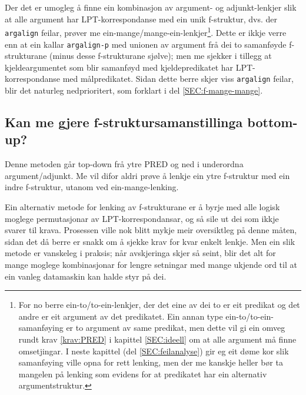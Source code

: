 \documentclass[12pt,a4paper,oneside,draft]{report}
\begin{document}
Der det er umogleg å finne ein kombinasjon av argument- og
 adjunkt-lenkjer slik at alle argument har LPT\hyp{}korrespondanse med ein
 unik f\hyp{}struktur, dvs. der \texttt{argalign} feilar, prøver me
 ein-mange/mange-ein-lenkjer\footnote{For no berre ein-to/to-ein-lenkjer, der det eine av dei to er
        eit predikat og det andre er eit argument av det
        predikatet. Ein annan type ein-to/to-ein-samanføying er to
        argument av same predikat, men dette vil gi ein omveg rundt
        krav \ref{krav:PRED} i kapittel \ref{SEC:ideell} om at alle
        argument må finne omsetjingar. I neste kapittel (del
        \ref{SEC:feilanalyse}) gir eg eit døme kor slik samanføying
        ville opna for rett lenking, men der me kanskje heller bør ta
        mangelen på lenking som evidens for at predikatet har ein
        alternativ argumentstruktur. }. Dette er ikkje verre enn at ein
 kallar \texttt{argalign-p} med unionen av argument frå dei to samanføyde
 f\hyp{}strukturane (minus desse f\hyp{}strukturane sjølve); men me sjekker i
 tillegg at kjeldeargumentet som blir samanføyd med kjeldepredikatet
 har LPT\hyp{}korrespondanse med målpredikatet. Sidan dette berre skjer
 viss \texttt{argalign} feilar, blir det naturleg nedprioritert, som forklart
 i del \ref{SEC:f-mange-mange}.

\subsection{Kan me gjere f\hyp{}struktursamanstillinga bottom-up?}
\label{sec-4.1.3}


Denne metoden går top-down frå ytre PRED og ned i underordna
 argument/adjunkt. Me vil difor aldri prøve å lenkje ein ytre
 f\hyp{}struktur med ein indre f\hyp{}struktur, utanom ved ein-mange-lenking.

Ein alternativ metode for lenking av f\hyp{}strukturane er å byrje med
 alle logisk moglege permutasjonar av LPT\hyp{}korrespondansar, og så sile
 ut dei som ikkje svarer til krava. Prosessen ville nok blitt mykje
 meir oversiktleg på denne måten, sidan det då berre er snakk om å
 sjekke krav for kvar enkelt lenkje.  Men ein slik metode er vanskeleg
 i praksis; når avskjeringa skjer så seint, blir det alt for mange
 moglege kombinasjonar for lengre setningar med mange ukjende ord til
 at ein vanleg datamaskin kan halde styr på dei.
\end{document}
